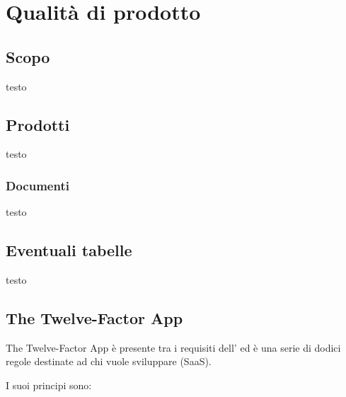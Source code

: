 \section{Qualità di prodotto}

\subsection{Scopo}
testo

\subsection{Prodotti}
testo

	\subsubsection{Documenti}
	testo
	
\subsection{Eventuali tabelle}
testo

\subsection{The Twelve-Factor App}
The Twelve-Factor App è presente tra i requisiti dell' ed è una serie di dodici regole destinate ad chi vuole sviluppare  (SaaS).

I suoi principi sono:

